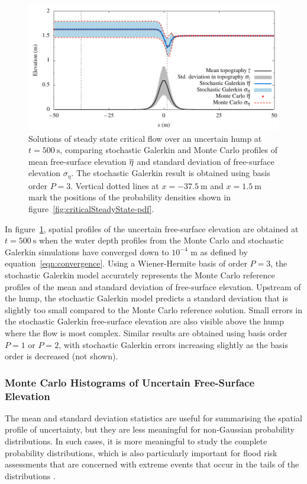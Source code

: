\begin{figure}
    \centering
    \includegraphics{fig-criticalSteadyState-flow.pdf}
    \caption{Solutions of steady state critical flow over an uncertain hump at $t = \SI{500}{\second}$, comparing stochastic Galerkin and Monte Carlo profiles of mean free-surface elevation $\overline{\eta}$ and standard deviation of free-surface elevation $\sigma_\eta$.
    The stochastic Galerkin result is obtained using basis order $P = 3$.
    Vertical dotted lines at $x = \SI{-37.5}{\meter}$ and $x = \SI{1.5}{\meter}$ mark the positions of the probability densities shown in figure~\ref{fig:criticalSteadyState-pdf}.
    }
    \label{fig:criticalSteadyState-flow}
\end{figure}

In figure~\ref{fig:criticalSteadyState-flow}, spatial profiles of the uncertain free-surface elevation are obtained at $t = \SI{500}{\second}$ when the water depth profiles from the Monte Carlo and stochastic Galerkin simulations have converged down to $10^{-4}$ \si{\meter} as defined by equation~\eqref{eqn:convergence}.
Using a Wiener-Hermite basis of order $P=3$, the stochastic Galerkin model accurately represents the Monte Carlo reference profiles of the mean and standard deviation of free-surface elevation.
Upstream of the hump, the stochastic Galerkin model predicts a standard deviation that is slightly too small compared to the Monte Carlo reference solution.
Small errors in the stochastic Galerkin free-surface elevation are also visible above the hump where the flow is most complex.
Similar results are obtained using basis order $P=1$ or $P=2$, with stochastic Galerkin errors increasing slightly as the basis order is decreased (not shown).

\subsubsection{Monte Carlo Histograms of Uncertain Free-Surface Elevation}
The mean and standard deviation statistics are useful for summarising the spatial profile of uncertainty, but they are less meaningful for non-Gaussian probability distributions.
In such cases, it is more meaningful to study the complete probability distributions, which is also particularly important for flood risk assessments that are concerned with extreme events that occur in the tails of the distributions \citep{ge2011}.

